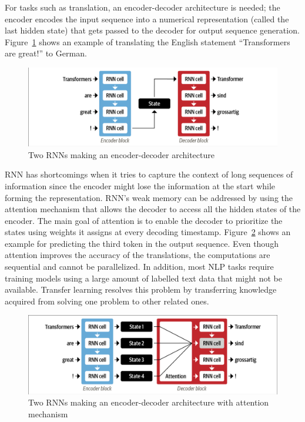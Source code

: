 For tasks such as translation, an encoder-decoder architecture is needed;  the encoder encodes the
input sequence into a numerical representation (called the last hidden state) that gets passed to
the decoder for output sequence generation. Figure~\ref{fig:rnn_encoder_decoder} shows an example of
translating the English statement ``Transformers are great!'' to German. 

\begin{figure}[H]
\begin{center}
  \includegraphics[width=12cm, trim={0.1cm 0.1cm 0.1cm 0.1cm},clip]{./images/encoder-decoder_rnn.png}
\end{center}
\caption{Two RNNs making an encoder-decoder architecture \cite{tunstallNaturalLanguageProcessing2022}}
\label{fig:rnn_encoder_decoder}
\end{figure}

\ac{RNN} has shortcomings when it tries to capture the context of long sequences of information
since the encoder might lose the information at the start while forming the representation.
\ac{RNN}'s weak memory can be addressed by using the attention mechanism that allows the decoder to
access all the hidden states of the encoder. The main goal of attention is to enable the decoder to
prioritize the states using weights it assigns at every decoding timestamp.
Figure~\ref{fig:rnn_encoder_decoder_attention} shows an example for predicting the third token in
the output sequence. Even though attention improves the accuracy of the translations, the
computations are sequential and cannot be parallelized. In addition, most \ac{NLP} tasks require
training models using a large amount of labelled text data that might not be available. Transfer
learning resolves this problem by transferring knowledge acquired from solving one problem to other
related ones.

\begin{figure}[H]
\begin{center}
  \includegraphics[width=12cm,trim={0.1cm 0.1cm 0.1cm 0.1cm},clip]{./images/encoder-decoder_rnn_attention.png}
\end{center}
\caption{Two RNNs making an encoder-decoder architecture with attention mechanism \cite{tunstallNaturalLanguageProcessing2022}}
\label{fig:rnn_encoder_decoder_attention}
\end{figure}

